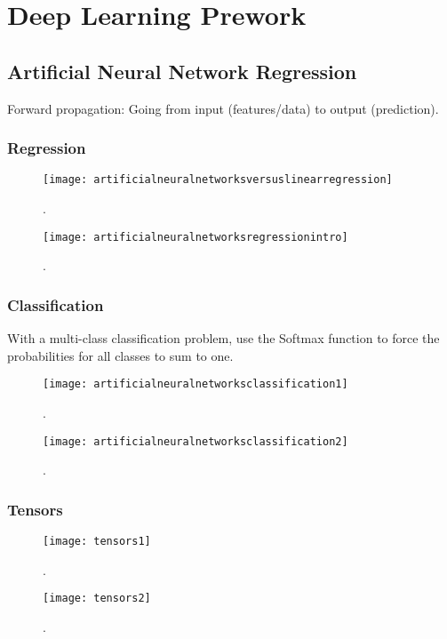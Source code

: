 	\chapter{Deep Learning Prework}
	\section{Artificial Neural Network Regression}

Forward propagation: Going from input (features/data) to output (prediction).

	\subsection{Regression}
 	\begin{figure}[h]
		\centering
		\texttt{[image: artificialneuralnetworksversuslinearregression]}
		\caption{.}
		\label{fig:artificialneuralnetworksversuslinearregression}
	\end{figure}


 	\begin{figure}[h]
		\centering
		\texttt{[image: artificialneuralnetworksregressionintro]}
		\caption{.}
		\label{fig:artificialneuralnetworksregressionintro}
	\end{figure}

	\subsection{Classification}
With a multi-class classification problem, use the Softmax function to force the probabilities for all classes to sum to one.

 	\begin{figure}[h]
		\centering
		\texttt{[image: artificialneuralnetworksclassification1]}
		\caption{.}
		\label{fig:artificialneuralnetworksclassification1}
	\end{figure}

 	\begin{figure}[h]
		\centering
		\texttt{[image: artificialneuralnetworksclassification2]}
		\caption{.}
		\label{fig:artificialneuralnetworksclassification2}
	\end{figure}

	\subsection{Tensors}

 	\begin{figure}[tbh]
		\centering
		\texttt{[image: tensors1]}
		\caption{.}
		\label{fig:tensors1}
	\end{figure}
 	\begin{figure}[tbh]
		\centering
		\texttt{[image: tensors2]}
		\caption{.}
		\label{fig:tensors2}
	\end{figure}

